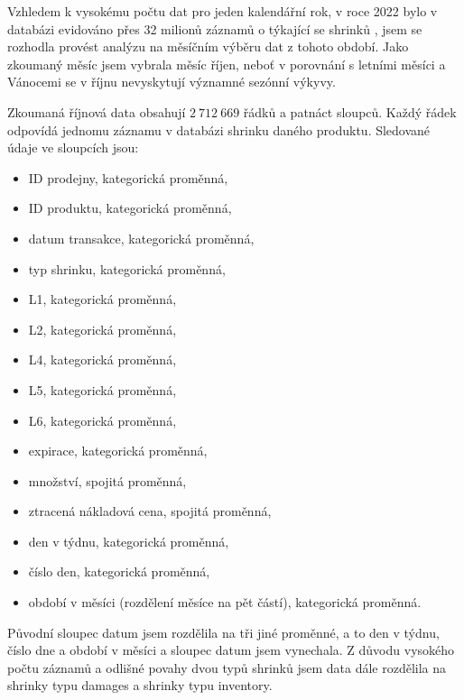 
Vzhledem k vysokému počtu dat pro jeden kalendářní rok, 
v roce 2022 bylo v databázi evidováno přes 32 milionů záznamů o týkající se shrinků
, jsem se rozhodla provést analýzu na měsíčním výběru dat z tohoto období. Jako zkoumaný měsíc jsem vybrala měsíc říjen, neboť v porovnání s letními měsíci a Vánocemi se v říjnu nevyskytují významné sezónní výkyvy.


Zkoumaná říjnová data obsahují $2\ 712\ 669$ řádků a patnáct sloupců. Každý řádek odpovídá jednomu záznamu v databázi shrinku daného produktu. Sledované údaje ve sloupcích jsou: 
\begin{itemize}
    \item ID prodejny, kategorická proměnná,
    \item ID produktu, kategorická proměnná,
    \item datum transakce, kategorická proměnná,
    \item typ shrinku, kategorická proměnná,
    \item L1, kategorická proměnná,
    \item L2, kategorická proměnná,
    \item L4, kategorická proměnná,
    \item L5, kategorická proměnná,
    \item L6, kategorická proměnná,
    \item expirace, kategorická proměnná,
    \item množství, spojitá proměnná,
    \item ztracená nákladová cena, spojitá proměnná,
    \item den v týdnu, kategorická proměnná,
    \item číslo den, kategorická proměnná,
    \item období v měsíci (rozdělení měsíce na pět částí), kategorická proměnná.
\end{itemize}
Původní sloupec datum jsem rozdělila na tři jiné proměnné, a to den v týdnu, číslo dne a období v měsíci a sloupec datum jsem vynechala. Z důvodu vysokého počtu záznamů a odlišné povahy dvou typů shrinků jsem data dále rozdělila na shrinky typu damages a shrinky typu inventory. 


